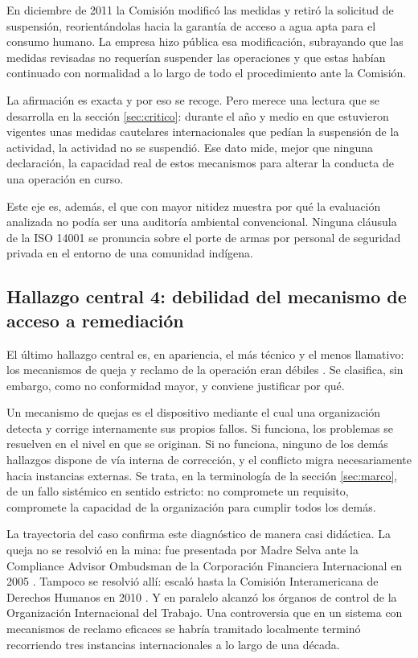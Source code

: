 En diciembre de 2011 la Comisión modificó las medidas y retiró la solicitud de
suspensión, reorientándolas hacia la garantía de acceso a agua apta para el
consumo humano. La empresa hizo pública esa modificación, subrayando que las
medidas revisadas no requerían suspender las operaciones y que estas habían
continuado con normalidad a lo largo de todo el procedimiento ante la Comisión.

La afirmación es exacta y por eso se recoge. Pero merece una lectura que se
desarrolla en la sección \ref{sec:critico}: durante el año y medio en que
estuvieron vigentes unas medidas cautelares internacionales que pedían la
suspensión de la actividad, la actividad no se suspendió. Ese dato mide, mejor que
ninguna declaración, la capacidad real de estos mecanismos para alterar la
conducta de una operación en curso.

Este eje es, además, el que con mayor nitidez muestra por qué la evaluación
analizada no podía ser una auditoría ambiental convencional. Ninguna cláusula de
la ISO 14001 se pronuncia sobre el porte de armas por personal de seguridad
privada en el entorno de una comunidad indígena.

\subsection{Hallazgo central 4: debilidad del mecanismo de acceso a remediación}

El último hallazgo central es, en apariencia, el más técnico y el menos
llamativo: los mecanismos de queja y reclamo de la operación eran débiles
\parencite{oncommonground2010hria}. Se clasifica, sin embargo, como no
conformidad mayor, y conviene justificar por qué.

Un mecanismo de quejas es el dispositivo mediante el cual una organización detecta
y corrige internamente sus propios fallos. Si funciona, los problemas se resuelven
en el nivel en que se originan. Si no funciona, ninguno de los demás hallazgos
dispone de vía interna de corrección, y el conflicto migra necesariamente hacia
instancias externas. Se trata, en la terminología de la sección \ref{sec:marco},
de un fallo sistémico en sentido estricto: no compromete un requisito, compromete
la capacidad de la organización para cumplir todos los demás.

La trayectoria del caso confirma este diagnóstico de manera casi didáctica. La
queja no se resolvió en la mina: fue presentada por Madre Selva ante la Compliance
Advisor Ombudsman de la Corporación Financiera Internacional en 2005
\parencite{cao2006marlin}. Tampoco se resolvió allí: escaló hasta la Comisión
Interamericana de Derechos Humanos en 2010 \parencite{cidh2010medidas}. Y en
paralelo alcanzó los órganos de control de la Organización Internacional del
Trabajo. Una controversia que en un sistema con mecanismos de reclamo eficaces se
habría tramitado localmente terminó recorriendo tres instancias internacionales a
lo largo de una década.

